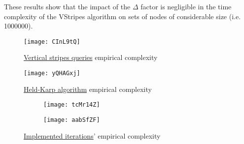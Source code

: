 These results show that the impact of the $\Delta$ factor is negligible in the time complexity of the VStripes algorithm on sets of nodes of considerable size (i.e. 1000000).

\begin{figure}[H]
    \centering
    \texttt{[image: CInL9tQ]}
    \caption{\hyperref[algorithm-vstripes]{Vertical stripes queries} empirical complexity}
\end{figure}


\begin{figure}[H]
    \centering
    \texttt{[image: yQHAGxj]}
    \caption{\hyperref[algorithm-tsp-heldkarp]{Held-Karp algorithm} empirical complexity}
\end{figure}

\begin{figure}[H]
    \centering
    \begin{subfigure}{0.49\textwidth}
        \centering
        \texttt{[image: tcMr14Z]}
    \end{subfigure}
    \begin{subfigure}{0.49\textwidth}
        \centering
        \texttt{[image: aabSfZF]}
    \end{subfigure}
    \caption{\hyperref[iterations]{Implemented iterations}' empirical complexity}
\end{figure}
